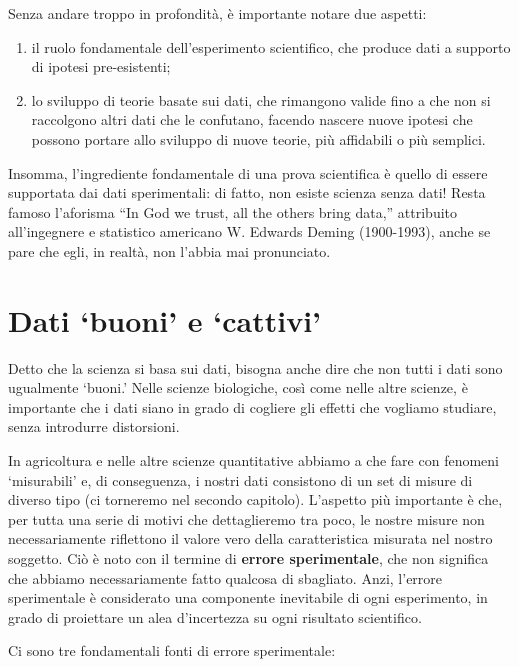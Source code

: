 \documentclass[a4paper,12pt,oneside]{book}
\providecommand{\tightlist}{%
  \setlength{\itemsep}{0pt}\setlength{\parskip}{0pt}}
\begin{document}
Senza andare troppo in profondità, è importante notare due aspetti:

\begin{enumerate}
\def\labelenumi{\arabic{enumi}.}
\tightlist
\item
  il ruolo fondamentale dell'esperimento scientifico, che produce dati a supporto di ipotesi pre-esistenti;
\item
  lo sviluppo di teorie basate sui dati, che rimangono valide fino a che non si raccolgono altri dati che le confutano, facendo nascere nuove ipotesi che possono portare allo sviluppo di nuove teorie, più affidabili o più semplici.
\end{enumerate}

Insomma, l'ingrediente fondamentale di una prova scientifica è quello di essere supportata dai dati sperimentali: di fatto, non esiste scienza senza dati! Resta famoso l'aforisma ``In God we trust, all the others bring data,'' attribuito all'ingegnere e statistico americano W. Edwards Deming (1900-1993), anche se pare che egli, in realtà, non l'abbia mai pronunciato.

\hypertarget{dati-buoni-e-cattivi}{%
\section{Dati `buoni' e `cattivi'}\label{dati-buoni-e-cattivi}}

Detto che la scienza si basa sui dati, bisogna anche dire che non tutti i dati sono ugualmente `buoni.' Nelle scienze biologiche, così come nelle altre scienze, è importante che i dati siano in grado di cogliere gli effetti che vogliamo studiare, senza introdurre distorsioni.

In agricoltura e nelle altre scienze quantitative abbiamo a che fare con fenomeni `misurabili' e, di conseguenza, i nostri dati consistono di un set di misure di diverso tipo (ci torneremo nel secondo capitolo). L'aspetto più importante è che, per tutta una serie di motivi che dettaglieremo tra poco, le nostre misure non necessariamente riflettono il valore vero della caratteristica misurata nel nostro soggetto. Ciò è noto con il termine di \textbf{errore sperimentale}, che non significa che abbiamo necessariamente fatto qualcosa di sbagliato. Anzi, l'errore sperimentale è considerato una componente inevitabile di ogni esperimento, in grado di proiettare un alea d'incertezza su ogni risultato scientifico.

Ci sono tre fondamentali fonti di errore sperimentale:
\end{document}

